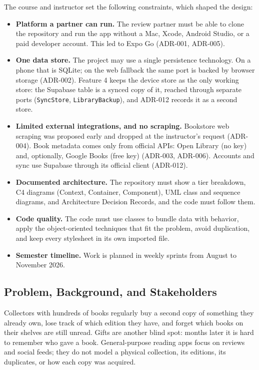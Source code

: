 \documentclass[12pt]{article}
\begin{document}
The course and instructor set the following constraints, which shaped the design:
\begin{itemize}
    \item \textbf{Platform a partner can run.} The review partner must be able to clone the repository and run the app without a Mac, Xcode, Android Studio, or a paid developer account. This led to Expo Go (ADR-001, ADR-005).
    \item \textbf{One data store.} The project may use a single persistence technology. On a phone that is SQLite; on the web fallback the same port is backed by browser storage (ADR-002). Feature 4 keeps the device store as the only working store: the Supabase table is a synced copy of it, reached through separate ports (\texttt{SyncStore}, \texttt{LibraryBackup}), and ADR-012 records it as a second store.
    \item \textbf{Limited external integrations, and no scraping.} Bookstore web scraping was proposed early and dropped at the instructor's request (ADR-004). Book metadata comes only from official APIs: Open Library (no key) and, optionally, Google Books (free key) (ADR-003, ADR-006). Accounts and sync use Supabase through its official client (ADR-012).
    \item \textbf{Documented architecture.} The repository must show a tier breakdown, C4 diagrams (Context, Container, Component), UML class and sequence diagrams, and Architecture Decision Records, and the code must follow them.
    \item \textbf{Code quality.} The code must use classes to bundle data with behavior, apply the object-oriented techniques that fit the problem, avoid duplication, and keep every stylesheet in its own imported file.
    \item \textbf{Semester timeline.} Work is planned in weekly sprints from August to November 2026.
\end{itemize}

\subsection{Problem, Background, and Stakeholders}

Collectors with hundreds of books regularly buy a second copy of something they already own, lose track of which edition they have, and forget which books on their shelves are still unread. Gifts are another blind spot: months later it is hard to remember who gave a book. General-purpose reading apps focus on reviews and social feeds; they do not model a physical collection, its editions, its duplicates, or how each copy was acquired.
\end{document}
